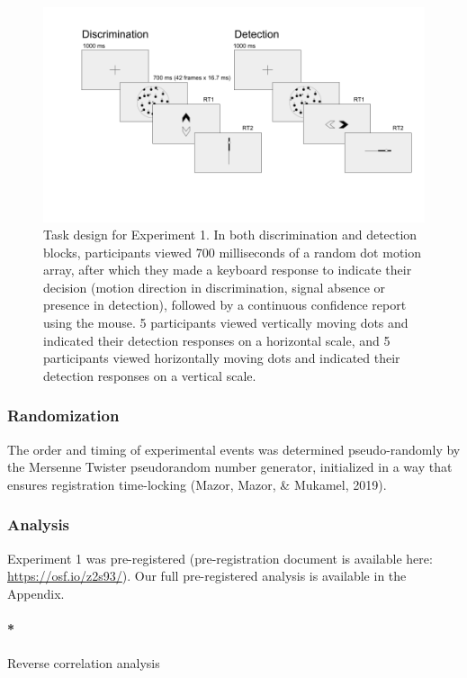 \documentclass[
  english,
  man]{apa6}
\let\oldparagraph\paragraph
\renewcommand{\paragraph}[1]{\oldparagraph{#1}\mbox{}}
\begin{document}
\begin{figure}
\includegraphics[width=\textwidth]{figures/designExp1} \caption[Experimental design for Exp. 1]{Task design for Experiment 1. In both discrimination and detection blocks, participants viewed 700 milliseconds of a random dot motion array, after which they made a keyboard response to indicate their decision (motion direction in discrimination, signal absence or presence in detection), followed by a continuous confidence report using the mouse. 5 participants viewed vertically moving dots and indicated their detection responses on a horizontal scale, and 5 participants viewed horizontally moving dots and indicated their detection responses on a vertical scale. }\label{fig:RC-exp1-design}
\end{figure}

\hypertarget{randomization}{%
\subsubsection{Randomization}\label{randomization}}

The order and timing of experimental events was determined pseudo-randomly by the Mersenne Twister pseudorandom number generator, initialized in a way that ensures registration time-locking (Mazor, Mazor, \& Mukamel, 2019).

\hypertarget{analysis}{%
\subsubsection{Analysis}\label{analysis}}

Experiment 1 was pre-registered (pre-registration document is available here: \url{https://osf.io/z2s93/}). Our full pre-registered analysis is available in the Appendix.

\hypertarget{reverse-correlation-analysis}{%
\paragraph*{Reverse correlation analysis}\label{reverse-correlation-analysis}}
\end{document}
